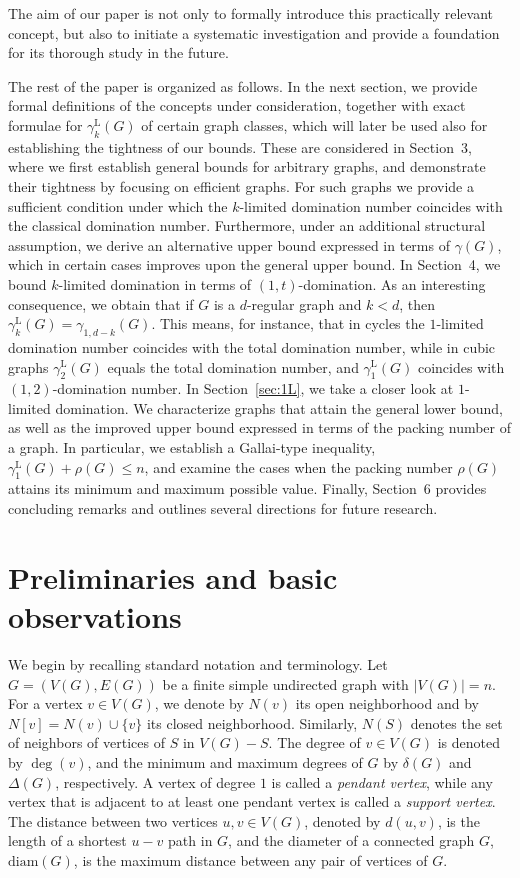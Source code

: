 \documentclass[11pt]{article}
\newcommand{\gammakL}{\gamma_k^{\mathrm L}}
\newcommand{\diam}{\mathrm{diam}}
\begin{document}
The aim of our paper is not only to formally introduce this practically relevant concept, but also to initiate a systematic investigation and provide a foundation for its thorough study in the future.
 
\medskip 

The rest of the paper is organized as follows. In the next section, we provide formal definitions of the
concepts under consideration, together with exact formulae for $\gammakL(G)$ of certain graph classes, 
which will later be used also for establishing the tightness of our bounds. These are considered in Section~3, where we first establish general bounds for arbitrary graphs, and demonstrate their tightness by  
focusing on efficient graphs. For such graphs we provide a sufficient condition under which the $k$-limited domination number coincides with the classical domination number. Furthermore, under an additional structural assumption, we derive an alternative upper bound expressed in terms of $\gamma(G)$, which in certain cases improves upon the general upper bound. In Section~4, we bound $k$-limited domination in terms of $(1,t)$-domination. As an interesting consequence, we obtain that if $G$ is a $d$-regular graph and $k<d$, then $\gammakL(G)=\gamma_{1,d-k}(G)$.
This means, for instance, that in cycles the $1$-limited domination number coincides with the total domination number, while in cubic graphs $\gamma_{2}^{\mathrm{L}}(G)$ equals the total domination number, and $\gamma_{1}^{\mathrm{L}}(G)$ coincides with $(1,2)$-domination number.  
In Section~\ref{sec:1L}, we take a closer look at $1$-limited domination. We characterize graphs that attain the general lower bound, as well as the improved upper bound expressed in terms of the packing number of a graph. In particular, we establish a Gallai-type inequality, $\gamma^{\mathrm L}_1(G) + \rho(G) \le n$, and examine the cases when the packing number $\rho(G)$ attains its minimum and maximum possible value.
Finally, Section~6 provides concluding remarks and outlines several directions for future research.





\section{Preliminaries and basic observations}


We begin by recalling standard notation and terminology. Let $G = (V(G),E(G))$ be a finite simple undirected graph with $|V(G)| = n$. For a vertex $v \in V(G)$, we denote by $N(v)$ its open neighborhood and by $N[v] = N(v) \cup \{v\}$ its closed neighborhood. Similarly, $N(S)$ denotes the set of neighbors of vertices of $S$ in $V(G)- S$. The degree of $v\in V(G)$ is denoted by $\deg(v)$, and the minimum and maximum degrees of $G$ by $\delta(G)$ and $\Delta(G)$, respectively.  A vertex of degree $1$ is called a \emph{pendant vertex}, while any vertex that is adjacent to at least one pendant vertex is called a \emph{support vertex}.
The distance between two vertices $u,v\in V(G)$, denoted by $d(u,v)$, is the length of a shortest $u-v$ path in $G$, and the diameter of a connected graph $G$, $\diam(G)$, is the maximum distance between any pair of vertices of $G$. 
\end{document}
